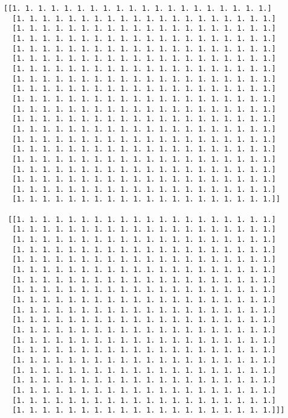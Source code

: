 \documentclass[11pt]{article}
\begin{document}
\begin{Verbatim}[commandchars=\\\{\}]
 [[1. 1. 1. 1. 1. 1. 1. 1. 1. 1. 1. 1. 1. 1. 1. 1. 1. 1. 1. 1.]
  [1. 1. 1. 1. 1. 1. 1. 1. 1. 1. 1. 1. 1. 1. 1. 1. 1. 1. 1. 1.]
  [1. 1. 1. 1. 1. 1. 1. 1. 1. 1. 1. 1. 1. 1. 1. 1. 1. 1. 1. 1.]
  [1. 1. 1. 1. 1. 1. 1. 1. 1. 1. 1. 1. 1. 1. 1. 1. 1. 1. 1. 1.]
  [1. 1. 1. 1. 1. 1. 1. 1. 1. 1. 1. 1. 1. 1. 1. 1. 1. 1. 1. 1.]
  [1. 1. 1. 1. 1. 1. 1. 1. 1. 1. 1. 1. 1. 1. 1. 1. 1. 1. 1. 1.]
  [1. 1. 1. 1. 1. 1. 1. 1. 1. 1. 1. 1. 1. 1. 1. 1. 1. 1. 1. 1.]
  [1. 1. 1. 1. 1. 1. 1. 1. 1. 1. 1. 1. 1. 1. 1. 1. 1. 1. 1. 1.]
  [1. 1. 1. 1. 1. 1. 1. 1. 1. 1. 1. 1. 1. 1. 1. 1. 1. 1. 1. 1.]
  [1. 1. 1. 1. 1. 1. 1. 1. 1. 1. 1. 1. 1. 1. 1. 1. 1. 1. 1. 1.]
  [1. 1. 1. 1. 1. 1. 1. 1. 1. 1. 1. 1. 1. 1. 1. 1. 1. 1. 1. 1.]
  [1. 1. 1. 1. 1. 1. 1. 1. 1. 1. 1. 1. 1. 1. 1. 1. 1. 1. 1. 1.]
  [1. 1. 1. 1. 1. 1. 1. 1. 1. 1. 1. 1. 1. 1. 1. 1. 1. 1. 1. 1.]
  [1. 1. 1. 1. 1. 1. 1. 1. 1. 1. 1. 1. 1. 1. 1. 1. 1. 1. 1. 1.]
  [1. 1. 1. 1. 1. 1. 1. 1. 1. 1. 1. 1. 1. 1. 1. 1. 1. 1. 1. 1.]
  [1. 1. 1. 1. 1. 1. 1. 1. 1. 1. 1. 1. 1. 1. 1. 1. 1. 1. 1. 1.]
  [1. 1. 1. 1. 1. 1. 1. 1. 1. 1. 1. 1. 1. 1. 1. 1. 1. 1. 1. 1.]
  [1. 1. 1. 1. 1. 1. 1. 1. 1. 1. 1. 1. 1. 1. 1. 1. 1. 1. 1. 1.]
  [1. 1. 1. 1. 1. 1. 1. 1. 1. 1. 1. 1. 1. 1. 1. 1. 1. 1. 1. 1.]
  [1. 1. 1. 1. 1. 1. 1. 1. 1. 1. 1. 1. 1. 1. 1. 1. 1. 1. 1. 1.]]

 [[1. 1. 1. 1. 1. 1. 1. 1. 1. 1. 1. 1. 1. 1. 1. 1. 1. 1. 1. 1.]
  [1. 1. 1. 1. 1. 1. 1. 1. 1. 1. 1. 1. 1. 1. 1. 1. 1. 1. 1. 1.]
  [1. 1. 1. 1. 1. 1. 1. 1. 1. 1. 1. 1. 1. 1. 1. 1. 1. 1. 1. 1.]
  [1. 1. 1. 1. 1. 1. 1. 1. 1. 1. 1. 1. 1. 1. 1. 1. 1. 1. 1. 1.]
  [1. 1. 1. 1. 1. 1. 1. 1. 1. 1. 1. 1. 1. 1. 1. 1. 1. 1. 1. 1.]
  [1. 1. 1. 1. 1. 1. 1. 1. 1. 1. 1. 1. 1. 1. 1. 1. 1. 1. 1. 1.]
  [1. 1. 1. 1. 1. 1. 1. 1. 1. 1. 1. 1. 1. 1. 1. 1. 1. 1. 1. 1.]
  [1. 1. 1. 1. 1. 1. 1. 1. 1. 1. 1. 1. 1. 1. 1. 1. 1. 1. 1. 1.]
  [1. 1. 1. 1. 1. 1. 1. 1. 1. 1. 1. 1. 1. 1. 1. 1. 1. 1. 1. 1.]
  [1. 1. 1. 1. 1. 1. 1. 1. 1. 1. 1. 1. 1. 1. 1. 1. 1. 1. 1. 1.]
  [1. 1. 1. 1. 1. 1. 1. 1. 1. 1. 1. 1. 1. 1. 1. 1. 1. 1. 1. 1.]
  [1. 1. 1. 1. 1. 1. 1. 1. 1. 1. 1. 1. 1. 1. 1. 1. 1. 1. 1. 1.]
  [1. 1. 1. 1. 1. 1. 1. 1. 1. 1. 1. 1. 1. 1. 1. 1. 1. 1. 1. 1.]
  [1. 1. 1. 1. 1. 1. 1. 1. 1. 1. 1. 1. 1. 1. 1. 1. 1. 1. 1. 1.]
  [1. 1. 1. 1. 1. 1. 1. 1. 1. 1. 1. 1. 1. 1. 1. 1. 1. 1. 1. 1.]
  [1. 1. 1. 1. 1. 1. 1. 1. 1. 1. 1. 1. 1. 1. 1. 1. 1. 1. 1. 1.]
  [1. 1. 1. 1. 1. 1. 1. 1. 1. 1. 1. 1. 1. 1. 1. 1. 1. 1. 1. 1.]
  [1. 1. 1. 1. 1. 1. 1. 1. 1. 1. 1. 1. 1. 1. 1. 1. 1. 1. 1. 1.]
  [1. 1. 1. 1. 1. 1. 1. 1. 1. 1. 1. 1. 1. 1. 1. 1. 1. 1. 1. 1.]
  [1. 1. 1. 1. 1. 1. 1. 1. 1. 1. 1. 1. 1. 1. 1. 1. 1. 1. 1. 1.]]]

    \end{Verbatim}
\end{document}
